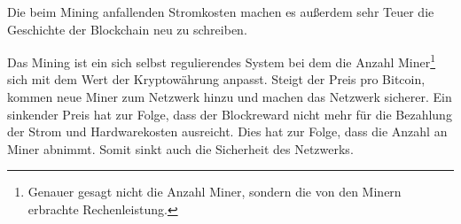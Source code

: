 Die beim Mining anfallenden Stromkosten machen es außerdem sehr Teuer die Geschichte der Blockchain neu zu schreiben. 

Das Mining ist ein sich selbst regulierendes System bei dem die Anzahl Miner\footnote{Genauer gesagt nicht die Anzahl Miner, sondern die von den Minern erbrachte Rechenleistung.} sich mit dem Wert der Kryptowährung anpasst. Steigt der Preis pro Bitcoin, kommen neue Miner zum Netzwerk hinzu und machen das Netzwerk sicherer. Ein sinkender Preis hat zur Folge, dass der Blockreward nicht mehr für die Bezahlung der Strom und Hardwarekosten ausreicht. Dies hat zur Folge, dass die Anzahl an Miner abnimmt. Somit sinkt auch die Sicherheit des Netzwerks.